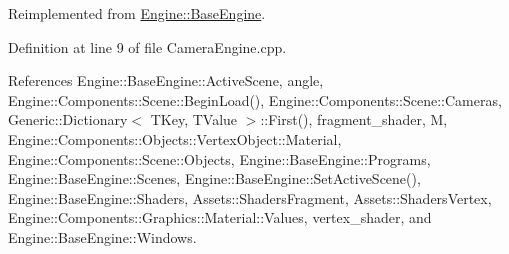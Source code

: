 Reimplemented from \mbox{\hyperlink{classEngine_1_1BaseEngine_ad9c141fe48c8c91e14e77ed5fcb90196}{Engine\+::\+Base\+Engine}}.



Definition at line 9 of file Camera\+Engine.\+cpp.



References Engine\+::\+Base\+Engine\+::\+Active\+Scene, angle, Engine\+::\+Components\+::\+Scene\+::\+Begin\+Load(), Engine\+::\+Components\+::\+Scene\+::\+Cameras, Generic\+::\+Dictionary$<$ T\+Key, T\+Value $>$\+::\+First(), fragment\+\_\+shader, M, Engine\+::\+Components\+::\+Objects\+::\+Vertex\+Object\+::\+Material, Engine\+::\+Components\+::\+Scene\+::\+Objects, Engine\+::\+Base\+Engine\+::\+Programs, Engine\+::\+Base\+Engine\+::\+Scenes, Engine\+::\+Base\+Engine\+::\+Set\+Active\+Scene(), Engine\+::\+Base\+Engine\+::\+Shaders, Assets\+::\+Shaders\+Fragment, Assets\+::\+Shaders\+Vertex, Engine\+::\+Components\+::\+Graphics\+::\+Material\+::\+Values, vertex\+\_\+shader, and Engine\+::\+Base\+Engine\+::\+Windows.


